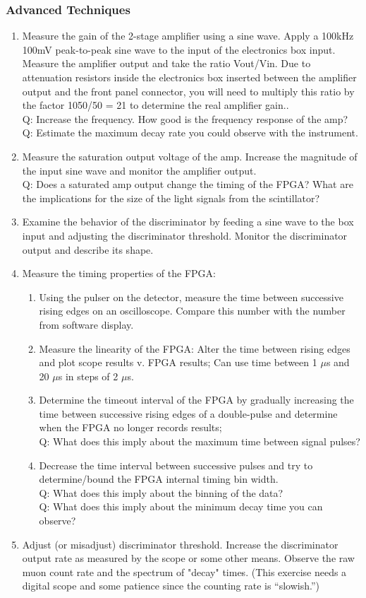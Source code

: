 \documentclass[aps,prb,groupedaddress,notitlepage,nofootinbib]{revtex4-1} %
\begin{document}
\subsubsection{Advanced Techniques}
\begin{enumerate}
\item Measure the gain of the 2-stage amplifier using a sine wave.
 Apply a 100kHz 100mV peak-to-peak sine wave to the input of the electronics box
input. Measure the amplifier output and take the ratio Vout/Vin. Due to attenuation
resistors inside the electronics box inserted between the amplifier output and the front
panel connector, you will need to multiply this ratio by the factor 1050/50 = 21 to
determine the real amplifier gain..\\
Q: Increase the frequency. How good is the frequency response of the amp?\\
Q: Estimate the maximum decay rate you could observe with the instrument.
\item Measure the saturation output voltage of the amp.
 Increase the magnitude of the input sine wave and monitor the amplifier output.\\
 Q: Does a saturated amp output change the timing of the FPGA? What are the
implications for the size of the light signals from the scintillator?
\item Examine the behavior of the discriminator by feeding a sine wave to the box input and
adjusting the discriminator threshold. Monitor the discriminator output and describe its
shape.
\item Measure the timing properties of the FPGA:
\begin{enumerate}
 \item Using the pulser on the detector, measure the time between successive rising edges
on an oscilloscope. Compare this number with the number from software display.
 \item Measure the linearity of the FPGA:
 Alter the time between rising edges and plot scope results v. FPGA results;
 Can use time between 1 $\mu$s and 20 $\mu$s in steps of 2 $\mu$s.
 \item Determine the timeout interval of the FPGA by gradually increasing the time between
successive rising edges of a double-pulse and determine when the FPGA no longer
records results;\\
 Q: What does this imply about the maximum time between signal pulses?
 \item Decrease the time interval between successive pulses and try to determine/bound the
FPGA internal timing bin width.\\
 Q: What does this imply about the binning of the data?\\
 Q: What does this imply about the minimum decay time you can observe? 
\end{enumerate}
\item Adjust (or misadjust) discriminator threshold.
Increase the discriminator output rate as measured by the scope or some other means.
Observe the raw muon count rate and the spectrum of "decay" times. (This exercise needs
a digital scope and some patience since the counting rate is “slowish.”)


\end{enumerate}
\end{document}
